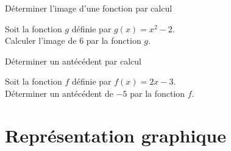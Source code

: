 \begin{bmethodet}{Déterminer l'image d'une fonction par calcul}
	
	Soit la fonction \(g\) définie par \(g(x)=x^{2}-2\).\\
	Calculer l'image de 6 par la fonction \(g\).
	
	
	\pointille[\textwidth]
	\pointille[\textwidth]
	\pointille[\textwidth]
\end{bmethodet}


\begin{bmethodet}{Déterminer un antécédent par calcul}
	
	Soit la fonction \(f\) définie par \(f(x)=2 x-3\).\\
	Déterminer un antécédent de $-5$ par la fonction \(f\).
	
	
	\pointille[\textwidth]
	\pointille[\textwidth]
	\pointille[\textwidth]
	\pointille[\textwidth]
	\pointille[\textwidth]
	\pointille[\textwidth]
\end{bmethodet}

\vspace*{-1.2cm}
\section{Représentation graphique}

